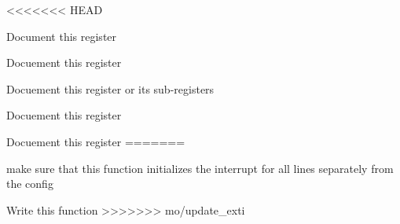 
\begin{DoxyRefList}
<<<<<<< HEAD
\item[Global \mbox{\hyperlink{struct_n_v_i_c___memory_map_type_a5a90033ce080d5bcd448f9f68d0e40f9}{NVIC\+\_\+\+Memory\+Map\+Type\+::IPRx}} \mbox{[}240\mbox{]}]\label{todo__todo000001}%
%
Document this register  
\item[Global \mbox{\hyperlink{struct_s_c_b___memory_map_type_af49031580ccaef660e066c6ce1f48bde}{SCB\+\_\+\+Memory\+Map\+Type\+::BFAR}} ]\label{todo__todo000005}%
%
Docuement this register  
\item[Global \mbox{\hyperlink{struct_s_c_b___memory_map_type_a7e18a3ab62644534a82ebc0273c7a811}{SCB\+\_\+\+Memory\+Map\+Type\+::CFSR}} ]\label{todo__todo000003}%
%
Docuement this register or its sub-\/registers  
\item[Global \mbox{\hyperlink{struct_s_c_b___memory_map_type_a120bb9fd3069ae7490d672591e5c3e20}{SCB\+\_\+\+Memory\+Map\+Type\+::MMFAR}} ]\label{todo__todo000004}%
%
Docuement this register  
\item[Global \mbox{\hyperlink{struct_s_c_b___memory_map_type_a841b17f933d2b37d051b51166a24c171}{SCB\+\_\+\+Memory\+Map\+Type\+::VTOR}} ]\label{todo__todo000002}%
%
Docuement this register 
=======
\item[Global \mbox{\hyperlink{_e_x_t_i__program_8c_af54debc6d14edcd542b2d03f68b181b8}{MEXTI\+\_\+v\+Init}} (void)]\label{todo__todo000001}%
%
make sure that this function initializes the interrupt for all lines separately from the config  
\item[Global \mbox{\hyperlink{_e_x_t_i__interface_8h_a4855e79776f4d6ab5414c92a08a39c05}{MEXTI\+\_\+v\+Init\+\_\+\+With\+Struct}} (\mbox{\hyperlink{group__compiler_ga30c6e83ff2cac859ff6d852ea99fa3f1}{P2\+VAR(\+EXTI\+\_\+\+Config\+Type)}} A\+\_\+x\+Config)]\label{todo__todo000002}%
%
Write this function 
>>>>>>> mo/update_exti
\end{DoxyRefList}
